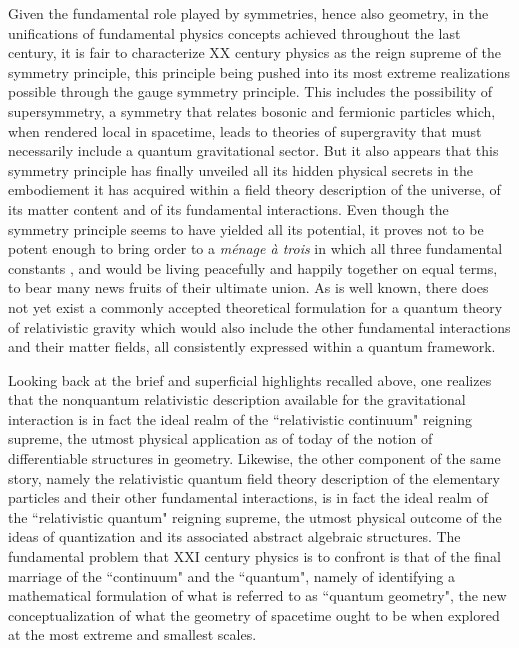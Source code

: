 \documentclass[a4paper,11pt]{article}
\begin{document}
Given the fundamental role played by symmetries, hence also geometry, in the
unifications of fundamental physics concepts achieved throughout the last
century, it is fair to characterize XX\coordHE{} century
physics as the reign supreme of the symmetry principle, this principle being 
pushed into its most extreme realizations possible through the gauge symmetry
principle. This includes the possibility of supersymmetry, a symmetry that
relates bosonic and fermionic particles which, when rendered local in 
spacetime, leads to theories of supergravity that must necessarily include
a quantum gravitational sector. But it also appears that this symmetry 
principle has finally unveiled all its hidden physical secrets in the 
embodiement it has acquired within a field theory description of the 
universe, of its matter content and of its fundamental interactions. 
Even though the symmetry principle seems to have yielded all its potential, 
it proves not to be potent enough to bring order to a 
{\sl m\'enage \`a trois\/} in which all three fundamental constants 
\coordHE{}, \coordHE{} and \myHighlight{$\hbar$}\coordHE{} would be living peacefully and happily together on 
equal terms, to bear many news fruits of their ultimate union.
As is well known, there does not yet exist a commonly accepted
theoretical formulation for a quantum theory of relativistic gravity
which would also include the other fundamental interactions and their
matter fields, all consistently expressed within a quantum framework.

Looking back at the brief and superficial highlights recalled above,
one realizes that the nonquantum relativistic description available for
the gra\-vi\-ta\-tional interaction is in fact the ideal realm of the
``relativistic continuum" reigning supreme, the utmost physical application 
as of today of the notion of differentiable structures in geometry. Likewise, 
the other component of the same story, namely the relativistic quantum field 
theory description of the elementary particles and their other fundamental 
interactions, is in fact the ideal realm of the ``relativistic quantum" 
reigning supreme, the utmost physical outcome of the ideas of quantization 
and its associated abstract algebraic structures. The fundamental problem 
that XXI\coordHE{} century physics is to confront is that of the final 
marriage of the ``continuum" and the ``quantum", namely of identifying 
a mathematical formulation of what is referred to as ``quantum geometry", 
the new conceptualization of what the geometry of spacetime ought to be when
explored at the most extreme and smallest scales.
\end{document}

